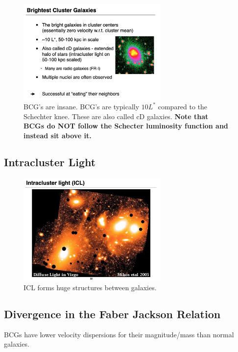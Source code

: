 \documentclass{article}
\begin{document}
\begin{figure}
    \centering
    \includegraphics[width=0.66\textwidth]{figs/Screen Shot 2021-10-29 at 10.48.38 AM.png}
    \caption{BCG's are insane. BCG's are typically $10L^*$ compared to the Schechter knee. These are also called cD galaxies. \textbf{Note that BCGs do NOT follow the Schecter luminosity function and instead sit above it. }}
    \label{fig:bcg}
\end{figure}

\subsection{Intracluster Light}

\begin{figure}
    \centering
    \includegraphics[width=0.66\textwidth]{figs/Screen Shot 2021-10-29 at 10.52.32 AM.png}
    \caption{ICL forms huge structures between galaxies. }
    \label{fig:asdasdasddddddd}
\end{figure}

\subsection{Divergence in the Faber Jackson Relation}

BCGs have lower velocity dispersions for their magnitude/mass than normal galaxies.
\end{document}
